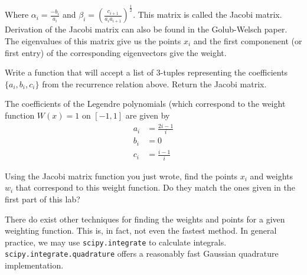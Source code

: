 Where $\alpha_i = \frac{-b_i}{a_i}$ and $\beta_i = (\frac{c_{i+1}}{a_ia_{i+1}})^{\frac{1}{2}}$.  This matrix is called the Jacobi matrix.  Derivation of the Jacobi matrix can also be found in the Golub-Welsch paper.  The eigenvalues of this matrix give us the points $x_i$ and the first componenent (or first entry) of the corresponding eigenvectors give the weight.

\begin{problem}
Write a function that will accept a list of 3-tuples representing the coefficients $\{a_i, b_i, c_i\}$ from the recurrence relation above.  Return the Jacobi matrix.
\end{problem}

\begin{problem}
The coefficients of the Legendre polynomials (which correspond to the weight function $W(x) = 1$ on $[-1,1]$ are given by
\begin{align*}
a_i &= \frac{2i - 1}{i} \\
b_i &= 0 \\
c_i &= \frac{i-1}{i}
\end{align*}

Using the Jacobi matrix function you just wrote, find the points $x_i$ and weights $w_i$ that correspond to this weight function.  Do they match the ones given in the first part of this lab?

\end{problem}


There do exist other techniques for finding the weights and points for a given weighting function.  This is, in fact, not even the fastest method.  In general practice, we may use {\tt scipy.integrate} to calculate integrals.  {\tt scipy.integrate.quadrature} offers a reasonably fast Gaussian quadrature implementation.

